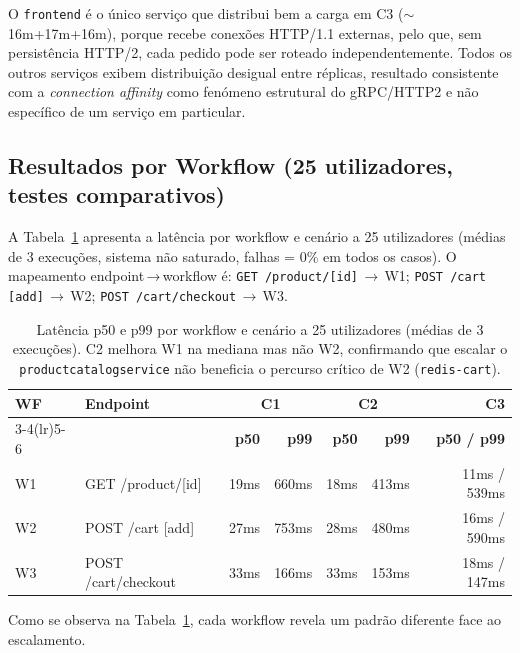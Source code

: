 \documentclass[manuscript,oneside]{acmart}
\begin{document}
O \texttt{frontend} é o único serviço que distribui bem a carga em C3 ($\sim$16m+17m+16m), porque recebe conexões HTTP/1.1 externas, pelo que, sem persistência HTTP/2, cada pedido pode ser roteado independentemente. Todos os outros serviços exibem distribuição desigual entre réplicas, resultado consistente com a \textit{connection affinity} como fenómeno estrutural do gRPC/HTTP2 e não específico de um serviço em particular.

\subsection{Resultados por Workflow (25 utilizadores, testes comparativos)}
\label{sec:por-workflow}

A Tabela~\ref{tab:por-workflow} apresenta a latência por workflow e cenário a 25 utilizadores (médias de 3 execuções, sistema não saturado, falhas = 0\% em todos os casos). O mapeamento endpoint\,→\,workflow é: \texttt{GET /product/[id]}\,$\to$\,W1; \texttt{POST /cart [add]}\,$\to$\,W2; \texttt{POST /cart/checkout}\,$\to$\,W3.

\begin{table}[H]
\caption{Latência p50 e p99 por workflow e cenário a 25 utilizadores (médias de 3 execuções). C2 melhora W1 na mediana mas não W2, confirmando que escalar o \texttt{productcatalogservice} não beneficia o percurso crítico de W2 (\texttt{redis-cart}).}
\label{tab:por-workflow}
\begin{tabularx}{\columnwidth}{llrrrrr}
\toprule
\textbf{WF} & \textbf{Endpoint} & \multicolumn{2}{c}{\textbf{C1}} & \multicolumn{2}{c}{\textbf{C2}} & \textbf{C3} \\
\cmidrule(lr){3-4}\cmidrule(lr){5-6}
 & & \textbf{p50} & \textbf{p99} & \textbf{p50} & \textbf{p99} & \textbf{p50 / p99} \\
\midrule
W1 & GET /product/[id]   & 19ms & 660ms & 18ms & 413ms & 11ms / 539ms \\
W2 & POST /cart [add]    & 27ms & 753ms & 28ms & 480ms & 16ms / 590ms \\
W3 & POST /cart/checkout & 33ms & 166ms & 33ms & 153ms & 18ms / 147ms \\
\bottomrule
\end{tabularx}
\end{table}

Como se observa na Tabela~\ref{tab:por-workflow}, cada workflow revela um padrão diferente face ao escalamento.
\end{document}
